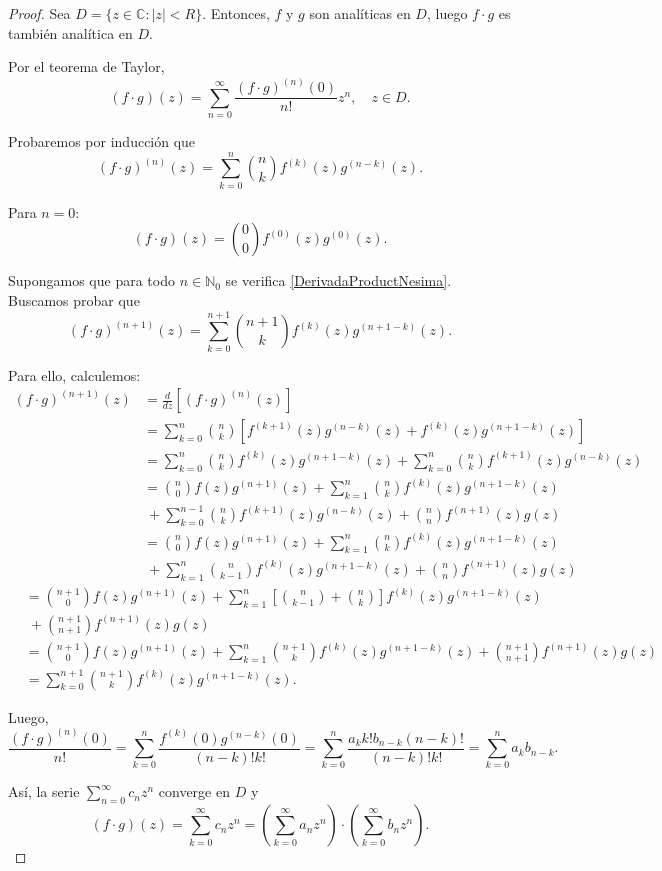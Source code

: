 \begin{proof}
Sea $D = \{z \in \mathbb{C} : |z| < R\}$. Entonces, $f$ y $g$ son analíticas en $D$, luego $f \cdot g$ es también analítica en $D$. 

Por el teorema de Taylor,
$$(f\cdot g)(z) = \sum_{n=0}^{\infty} \frac{(f\cdot g)^{(n)}(0)}{n!} z^n, \quad z \in D.$$

Probaremos por inducción que
\begin{equation}
 (f\cdot g)^{(n)}(z) = \sum_{k=0}^n \binom{n}{k} f^{(k)}(z) g^{(n-k)}(z).   \label{DerivadaProductNesima}
\end{equation}

Para $n = 0$:
$$(f \cdot g)(z) = \binom{0}{0} f^{(0)}(z) g^{(0)}(z).$$

Supongamos que para todo $n \in \mathbb{N}_0$ se verifica \eqref{DerivadaProductNesima}. Buscamos probar que 
$$(f\cdot g)^{(n+1)}(z) = \sum_{k=0}^{n+1} \binom{n+1}{k} f^{(k)}(z) g^{(n+1-k)}(z).$$

Para ello, calculemos:
\begin{align*}
   (f\cdot g)^{(n+1)}(z) &= \frac{d}{dz} \left[ (f\cdot g)^{(n)}(z) \right]  \\
   &= \sum_{k=0}^n \binom{n}{k} \left[ f^{(k+1)}(z) g^{(n-k)}(z) + f^{(k)}(z) g^{(n+1-k)}(z) \right] \\
   &= \sum_{k=0}^n \binom{n}{k} f^{(k)}(z) g^{(n+1-k)}(z) + \sum_{k=0}^n \binom{n}{k} f^{(k+1)}(z) g^{(n-k)}(z) \\
   &= \binom{n}{0} f(z) g^{(n+1)}(z) +  \sum_{k=1}^n \binom{n}{k} f^{(k)}(z) g^{(n+1-k)}(z) \\
   &~+ \sum_{k=0}^{n-1} \binom{n}{k} f^{(k+1)}(z) g^{(n-k)}(z) + \binom{n}{n} f^{(n+1)}(z) g(z) \\
   &= \binom{n}{0} f(z) g^{(n+1)}(z) +  \sum_{k=1}^n \binom{n}{k} f^{(k)}(z) g^{(n+1-k)}(z) \\
   &~+ \sum_{k=1}^{n} \binom{n}{k-1} f^{(k)}(z) g^{(n+1-k)}(z) + \binom{n}{n} f^{(n+1)}(z) g(z) 
\end{align*}
\begin{align*}
   &= \binom{n+1}{0} f(z) g^{(n+1)}(z) +  \sum_{k=1}^n \left[\binom{n}{k-1} +  \binom{n}{k} \right] f^{(k)}(z) g^{(n+1-k)}(z) \\
   &~+ \binom{n+1}{n+1} f^{(n+1)}(z) g(z) \\
   &= \binom{n+1}{0} f(z) g^{(n+1)}(z) +  \sum_{k=1}^n \binom{n+1}{k} f^{(k)}(z) g^{(n+1-k)}(z) + \binom{n+1}{n+1} f^{(n+1)}(z) g(z) \\
   &= \sum_{k=0}^{n+1} \binom{n+1}{k} f^{(k)}(z) g^{(n+1-k)}(z).
\end{align*}

Luego,
$$ \frac{(f\cdot g)^{(n)}(0)}{n!} = \sum_{k=0}^n \frac{f^{(k)}(0) g^{(n-k)}(0)}{(n-k)!k!}   = \sum_{k=0}^n \frac{a_k k! b_{n-k} (n-k)!}{(n-k)!k!}   = \sum_{k=0}^n a_k b_{n-k}.$$

Así, la serie $\sum\limits_{n=0}^{\infty} c_n z^n$ converge en $D$ y
$$(f\cdot g)(z) = \sum_{k=0}^{\infty} c_n z^n = \left(\sum_{k=0}^{\infty} a_n z^n \right) \cdot \left(\sum_{k=0}^{\infty} b_n z^n \right).$$
\end{proof}


